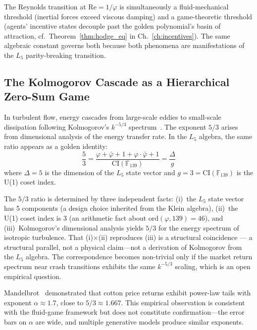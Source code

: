 The Reynolds transition at $\mathrm{Re} = 1/\varphi$ is simultaneously a fluid-mechanical threshold (inertial forces exceed viscous damping) and a game-theoretic threshold (agents' incentive states decouple past the golden polynomial's basin of attraction, cf.\ Theorem~\ref{thm:hodge_eq} in Ch.~\ref{ch:incentives}). The same algebraic constant governs both because both phenomena are manifestations of the $L_5$ parity-breaking transition.

\subsection{The Kolmogorov Cascade as a Hierarchical Zero-Sum Game}

In turbulent flow, energy cascades from large-scale eddies to small-scale dissipation following Kolmogorov's $k^{-5/3}$ spectrum~\cite{kolmogorov1941}. The exponent $5/3$ arises from dimensional analysis of the energy transfer rate. In the $L_5$ algebra, the same ratio appears as a golden identity:
\begin{equation}
  \frac{5}{3} = \frac{\varphi + \bar\varphi + 1 + \varphi \cdot \bar\varphi + 1}{\mathrm{CI}(\mathbb{F}_{139})} = \frac{\Delta}{g}
\end{equation}
where $\Delta = 5$ is the dimension of the $L_5$ state vector and $g = 3 = \mathrm{CI}(\mathbb{F}_{139})$ is the U(1) coset index.

\begin{remark}
The $5/3$ ratio is determined by three independent facts: (i)~the $L_5$ state vector has 5 components (a design choice inherited from the Klein algebra), (ii)~the U(1) coset index is 3 (an arithmetic fact about $\mathrm{ord}(\varphi, 139) = 46$), and (iii)~Kolmogorov's dimensional analysis yields $5/3$ for the energy spectrum of isotropic turbulence. That (i)$\times$(ii) reproduces (iii) is a structural coincidence --- a structural parallel, not a physical claim---not a derivation of Kolmogorov from the $L_5$ algebra. The correspondence becomes non-trivial only if the market return spectrum near crash transitions exhibits the same $k^{-5/3}$ scaling, which is an open empirical question.
\end{remark}

Mandelbrot~\cite{mandelbrot1963} demonstrated that cotton price returns exhibit power-law tails with exponent $\alpha \approx 1.7$, close to $5/3 \approx 1.667$. This empirical observation is consistent with the fluid-game framework but does not constitute confirmation---the error bars on $\alpha$ are wide, and multiple generative models produce similar exponents.

